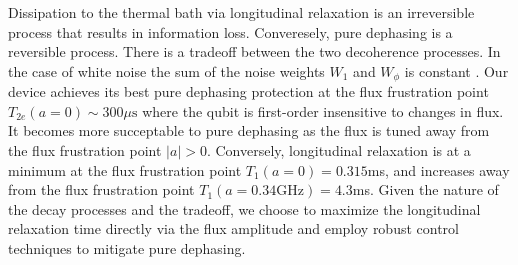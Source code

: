 \documentclass[
  amsfonts,
  amsmath,
  tbtags,
  amssymb,
  aps,
  nobibnotes,
  twocolumn,
  superscriptaddress,
]{revtex4-2}
\begin{document}
Dissipation to the thermal bath via longitudinal
relaxation is an irreversible process
that results in information loss.
Converesely, pure dephasing is a reversible process.
There is a tradeoff between the two decoherence processes. In the case of white
noise the sum of the noise weights $W_{1}$ and $W_{\phi}$
is constant \cite{huang2020engineering}.
Our device achieves its best pure dephasing
protection at the flux frustration point
$T_{2e}(a = 0) \sim 300 \mu\textrm{s}$
where the qubit is first-order insensitive to changes in flux.
It becomes more succeptable to pure dephasing as the flux is tuned away from the flux
frustration point $|a| > 0$. Conversely, longitudinal relaxation is at a minimum
at the flux frustration point $T_{1}(a = 0) = 0.315$ms,
and increases away from the flux frustration point
$T_{1}(a = 0.34 \textrm{GHz}) = 4.3$ms. Given the nature
of the decay processes and the tradeoff, we choose
to maximize the longitudinal relaxation time directly
via the flux amplitude and employ robust control techniques to mitigate
pure dephasing.
\end{document}
